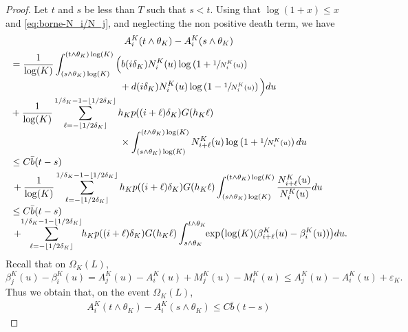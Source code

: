 \documentclass[10pt]{amsart}
\theoremstyle{plain}
\theoremstyle{remark}
\begin{document}
\begin{proof}
Let $t$ and $s$ be less than $T$ such that $s<t$. Using that $ \log (1+x)\leq x$ and \eqref{eq:borne-N_i/N_j}, and neglecting the non positive death term, we have\vspace*{-5pt}
\begin{multline*}
A_{i}^K(t\wedge \theta_K) - A_{i}^K(s\wedge \theta_K)\\
\begin{aligned}
&= \frac{1}{\log(K)}\int_{(s\wedge \theta_K) \log(K)}^{(t\wedge \theta_K)\log(K)}\Big(b(i \delta_{K})N^K_{i}(u) \log\left(1+\sfrac{1}{N^K_{i}(u)}\right)\\[-3pt]
&
\hspace{4cm} + d(i \delta_{K})N^K_{i}(u) \log\left(1-\sfrac{1}{N^K_{i}(u)}\right)\Big) du \\[-3pt]
& +\frac{1}{\log(K)} \sum_{\ell=-\lfloor 1/2\delta_K\rfloor}^{1/\delta_K-1-\lfloor 1/2\delta_K\rfloor} h_{K} p((i+\ell) \delta_{K}) G(h_{K}\ell)\\[-5pt]
& \hspace{4cm} \times \int_{(s\wedge \theta_K) \log(K)}^{(t\wedge \theta_K)\log(K)}N^K_{i+\ell}(u)\log\left(1+\sfrac{1}{N^K_{i}(u)}\right) du \\[-3pt]
&\leq C\bar b (t- s) \\
& \, + \frac{1}{\log(K)} \sum_{\ell=-\lfloor 1/2\delta_K\rfloor}^{1/\delta_K-1-\lfloor 1/2\delta_K\rfloor} h_{K} p((i+\ell) \delta_{K}) G(h_{K}\ell)\int_{(s\wedge \theta_K) \log(K)}^{(t\wedge \theta_K)\log(K)}\frac{N^K_{i+\ell}(u)}{N^K_{i}(u)} du\\[-3pt]
&\leq C\bar b (t - s)
\\[-3pt]
& \, +\hspace*{-1mm} \sum_{\ell=-\lfloor 1/2\delta_K\rfloor}^{1/\delta_K-1-\lfloor 1/2\delta_K\rfloor}\hspace*{-1mm} h_{K} p((i+\ell) \delta_{K}) G(h_{K}\ell)\int_{s\wedge \theta_K }^{t\wedge \theta_K}\hspace*{-1mm} \exp\bigl(\log(K) (\beta^K_{i+\ell}(u)-\beta^K_{i}(u))\bigr) du.
\end{aligned}
\end{multline*}
Recall that on $\Omega_K(L)$,\vspace*{-3pt}
\[\beta^K_{j}(u)-\beta^K_{i}(u) =A_{j}^K(u) - A_{i}^K(u)+ M_{j}^K(u) -M_{i}^K(u) \leq A_{j}^K(u) - A_{i}^K(u)+\varepsilon_K
.\]
Thus we obtain that, on the event $\Omega_K(L)$,\vspace*{-5pt}
\begin{multline*} A_{i}^K(t\wedge\theta_K) - A_{i}^K(s\wedge\theta_K)
\leq C\bar b (t - s)

\end{multline*}
\end{proof}
\end{document}
